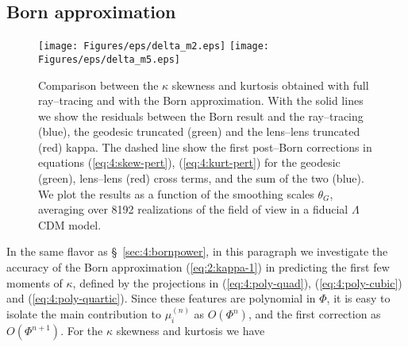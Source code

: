\subsection{Born approximation}
%
\begin{figure}
\begin{center}
\texttt{[image: Figures/eps/delta\_m2.eps]}
\texttt{[image: Figures/eps/delta\_m5.eps]}
\end{center}
\caption{Comparison between the $\kappa$ skewness and kurtosis obtained with full ray--tracing and with the Born approximation. With the solid lines we show the residuals between the Born result and the ray--tracing (blue), the geodesic truncated (green) and the lens--lens truncated (red) kappa. The dashed line show the first post--Born corrections in equations (\ref{eq:4:skew-pert}), (\ref{eq:4:kurt-pert}) for the geodesic (green), lens--lens (red) cross terms, and the sum of the two (blue). We plot the results as a function of the smoothing scales $\theta_G$, averaging over 8192 realizations of the field of view in a fiducial $\Lambda$CDM model.}
\label{fig:4:momRes}
\end{figure}
%
In the same flavor as \S~\ref{sec:4:bornpower}, in this paragraph we investigate the accuracy of the Born approximation (\ref{eq:2:kappa-1}) in predicting the first few moments of $\kappa$, defined by the projections in (\ref{eq:4:poly-quad}), (\ref{eq:4:poly-cubic}) and (\ref{eq:4:poly-quartic}). Since these features are polynomial in $\Phi$, it is easy to isolate the main contribution to $\mu^{(n)}_i$ as $O(\Phi^n)$, and the first correction as $O(\Phi^{n+1})$. For the $\kappa$ skewness and kurtosis we have 

